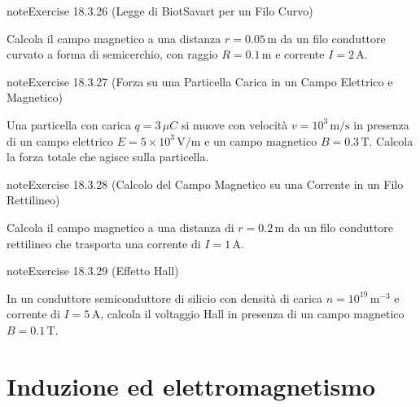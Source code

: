 \documentclass[letterpaper,10pt,italian]{jupyterBook}
\begin{document}
\begin{sphinxadmonition}{note}{Exercise 18.3.26 (Legge di Biot\sphinxhyphen{}Savart per un Filo Curvo)}



\sphinxAtStartPar
Calcola il campo magnetico a una distanza \(r = 0.05 \, \text{m}\) da un filo conduttore curvato a forma di semicerchio, con raggio \(R = 0.1 \, \text{m}\) e corrente \(I = 2 \, \text{A}\).
\end{sphinxadmonition}
 \label{exercise:ch/electromagnetism/electromagnetism-steady-problems-exercise-26}

\begin{sphinxadmonition}{note}{Exercise 18.3.27 (Forza su una Particella Carica in un Campo Elettrico e Magnetico)}



\sphinxAtStartPar
Una particella con carica \(q = 3 \, \mu C\) si muove con velocità \(v = 10^3 \, \text{m/s}\) in presenza di un campo elettrico \(E = 5 \times 10^3 \, \text{V/m}\) e un campo magnetico \(B = 0.3 \, \text{T}\). Calcola la forza totale che agisce sulla particella.
\end{sphinxadmonition}
 \label{exercise:ch/electromagnetism/electromagnetism-steady-problems-exercise-27}

\begin{sphinxadmonition}{note}{Exercise 18.3.28 (Calcolo del Campo Magnetico su una Corrente in un Filo Rettilineo)}



\sphinxAtStartPar
Calcola il campo magnetico a una distanza di \(r = 0.2 \, \text{m}\) da un filo conduttore rettilineo che trasporta una corrente di \(I = 1 \, \text{A}\).
\end{sphinxadmonition}
 \label{exercise:ch/electromagnetism/electromagnetism-steady-problems-exercise-28}

\begin{sphinxadmonition}{note}{Exercise 18.3.29 (Effetto Hall)}



\sphinxAtStartPar
In un conduttore semiconduttore di silicio con densità di carica \(n = 10^{19} \, \text{m}^{-3}\) e corrente di \(I = 5 \, \text{A}\), calcola il voltaggio Hall in presenza di un campo magnetico \(B = 0.1 \, \text{T}\).
\end{sphinxadmonition}

\sphinxstepscope


\section{Induzione ed elettromagnetismo}
\label{\detokenize{ch/electromagnetism/electromagnetism-general:induzione-ed-elettromagnetismo}}\label{\detokenize{ch/electromagnetism/electromagnetism-general:physics-hs-electromagnetism-electromagnetism-general}}\label{\detokenize{ch/electromagnetism/electromagnetism-general::doc}}
\end{document}
